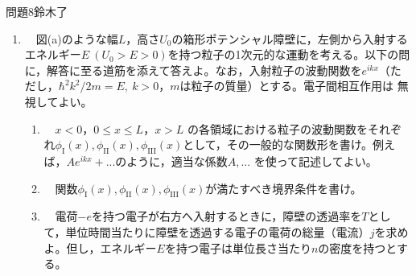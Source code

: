 \documentclass[fleqn]{jbook}
\begin{document}

\begin{question}{問題8}{鈴木了}
\setcounter{equation}{0}


\begin{enumerate}

  \item 　図(a)のような幅$L$，高さ$U_0$の箱形ポテンシャル障壁に，左側から入射するエネルギー$E~(U_0>E>0)$を持つ粒子の1次元的な運動を考える。以下の問に，解答に至る道筋を添えて答えよ。なお，入射粒子の波動関数を$e^{i kx}$（ただし，$\hbar^2k^2/2m=E,~k>0$，$m$は粒子の質量）とする。電子間相互作用は
無視してよい。\\

\begin{figure}[hbt]
\begin{center}

\vfill
\end{center}
\end{figure}

  \begin{enumerate}
  
    \item 　$x<0$，$0\le x\le L$，$x>L$ の各領域における粒子の波動関数をそれぞれ$\phi_\mathrm{I}(x),\phi_\mathrm{II}(x),\phi_\mathrm{III}(x)$として，その一般的な関数形を書け。例えば，$Ae^{i kx}+ ...$のように，適当な係数$A, ...$ を使って記述してよい。\\
    
    \item 　関数$\phi_\mathrm{I}(x),\phi_\mathrm{II}(x),\phi_\mathrm{III}(x)$が満たすべき境界条件を書け。\\
    
    \item 　電荷$-e$を持つ電子が右方へ入射するときに，障壁の透過率を$T$として，単位時間当たりに障壁を透過する電子の電荷の総量（電流）$j$を求めよ。但し，エネルギー$E$を持つ電子は単位長さ当たり$n$の密度を持つとする。\\
    
\end{enumerate}


\end{enumerate}
\end{question}
\end{document}
